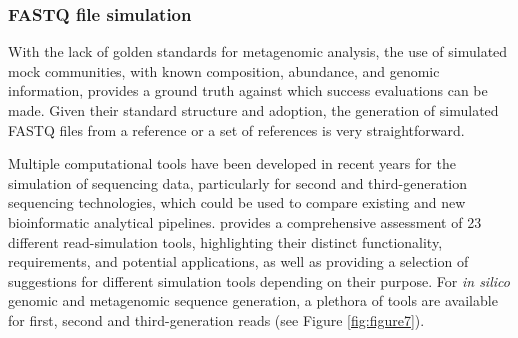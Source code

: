 \subsubsection{FASTQ file simulation} \label{ssec:_intro_fastq_sim}

With the lack of golden standards for metagenomic analysis, the use of simulated mock communities, with known composition, abundance, and genomic information, provides a ground truth against which success evaluations can be made. Given their standard structure and adoption, the generation of simulated FASTQ files from a reference or a set of references is very straightforward. 

Multiple computational tools have been developed in recent years for the simulation of sequencing data, particularly for second and third-generation sequencing technologies, which could be used to compare existing and new bioinformatic analytical pipelines. \cite{escalona_comparison_2016} provides a comprehensive assessment of 23 different read-simulation tools,  highlighting their distinct functionality, requirements, and potential applications, as well as providing a selection of suggestions for different simulation tools depending on their purpose. For \textit{in silico} genomic and metagenomic sequence generation, a plethora of tools are available for first, second and third-generation reads (see Figure \ref{fig:figure7}).

